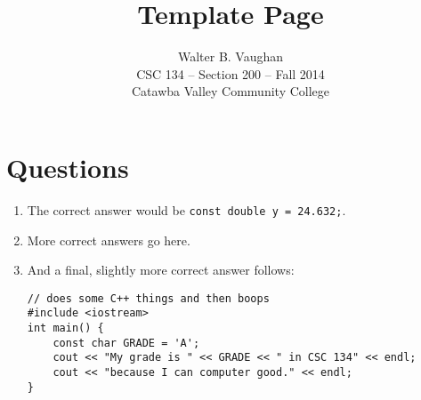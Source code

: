 \documentclass[11pt]{article}
\author{Walter B. Vaughan\\
        \small CSC 134 -- Section 200 -- Fall 2014\\
        \small Catawba Valley Community College}
\title{Template Page}
\date{\vspace{-5ex}}
\begin{document}
\maketitle

\section*{Questions}

\begin{enumerate}
	\item The correct answer would be \lstinline{const double y = 24.632;}.
	\item More correct answers go here.
	\item And a final, slightly more correct answer follows:
	\begin{lstlisting}
// does some C++ things and then boops
#include <iostream>
int main() {
	const char GRADE = 'A';
	cout << "My grade is " << GRADE << " in CSC 134" << endl;
	cout << "because I can computer good." << endl;
}
	\end{lstlisting}
\end{enumerate}
\end{document}
